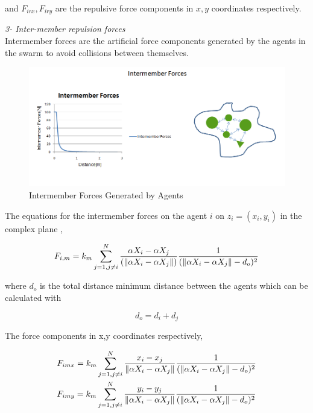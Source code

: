 and $F_{irx} , F_{iry} $ are the repulsive force components in $x,y$ coordinates respectively. \newline
						
\textit{		3- Inter-member repulsion forces} \\ 
Intermember forces are the artificial force components generated by the agents in the swarm to avoid collisions between themselves. 
			
\begin{figure}[H]
\caption{Intermember Forces Generated by Agents}
\centering
\includegraphics[scale = 0.60]{intermember_forces}
\end{figure}
			
The equations for the intermember forces on the agent $i$ on $z_i = (x_i, y_i)$  in the complex plane ,
			
\begin{equation}
F_{i,m} = k_m \sum_{j=1, j\neq i}^{N}\frac{\alpha X_i - \alpha X_j}{(\left\lVert\alpha X_i - \alpha X_j\right\rVert)} \frac{1}{(\left\lVert\alpha X_i - \alpha X_j\right\rVert - d_o)^2}
\end{equation}
			
where $d_o$ is the total distance minimum distance between the agents which can be calculated with

\begin{equation}
 d_o = d_i + d_j
\end{equation}
			
The force components in x,y coordinates respectively,

\begin{align*}
&F_{imx} = k_m \sum_{j=1, j\neq i}^{N}\frac{x_i- x_j}{\left\lVert\alpha X_i - \alpha X_j\right\rVert}  \frac{1}{(\left\lVert\alpha X_i - \alpha X_j\right\rVert - d_o)^2}\\
&F_{imy} = k_m \sum_{j=1, j\neq i}^{N}\frac{y_i- y_j}{\left\lVert\alpha X_i - \alpha X_j\right\rVert}  \frac{1}{(\left\lVert\alpha X_i - \alpha X_j\right\rVert - d_o)^2}\\
\end{align*}
		
